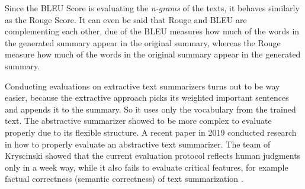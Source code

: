 Since the BLEU Score is evaluating the \textit{n-grams} of the texts, it behaves similarly as the Rouge Score. It can even be said that Rouge and BLEU are complementing each other, due of the BLEU measures how much of the words in the generated summary appear in the original summary, whereas the Rouge measure how much of the words in the original summary appear in the generated summary.

Conducting evaluations on extractive text summarizers turns out to be way easier, because the extractive approach picks its weighted important sentences and appends it to the summary. So it uses only the vocabulary from the trained text. The abstractive summarizer showed to be more complex to evaluate properly due to its flexible structure.
A recent paper in 2019 conducted research in how to properly evaluate an abstractive text summarizer. The team of Kryscinski showed that the current evaluation protocol reflects human judgments only in a week way, while it also fails to evaluate critical features, for example factual correctness (semantic correctness) of text summarization \cite{kryscinski-etal-2019-neural}.